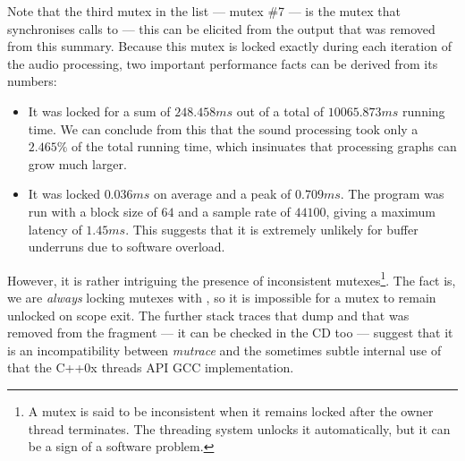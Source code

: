 Note that the third mutex in the list --- mutex \#7 --- is the mutex
that synchronises calls to  --- this can be
elicited from the  output that was removed from this
summary. Because this mutex is locked exactly during each iteration of
the audio processing, two important performance facts can be derived
from its numbers:
\begin{itemize}
\item It was locked for a sum of $248.458 ms$ out of a total of
  $10065.873 ms$ running time. We can conclude from this that the
  sound processing took only a $2.465\%$ of the total running time,
  which insinuates that processing graphs can grow much larger.
\item It was locked $0.036 ms$ on average and a peak of $0.709
  ms$. The program was run with a block size of $64$ and a sample rate
  of $44100$, giving a maximum latency of $1.45 ms$. This suggests
  that it is extremely unlikely for buffer underruns due to software
  overload.
\end{itemize}

However, it is rather intriguing the presence of inconsistent
mutexes\footnote{A mutex is said to be inconsistent when it remains
  locked after the owner thread terminates. The threading system
  unlocks it automatically, but it can be a sign of a software
  problem.}. The fact is, we are \emph{always} locking mutexes with
, so it is impossible for a mutex to remain
unlocked on scope exit. The further stack traces that 
dump and that was removed from the fragment --- it can be checked in
the CD too --- suggest that it is an incompatibility between
\emph{mutrace} and the sometimes subtle internal use of
 that the C++0x threads API GCC implementation.

